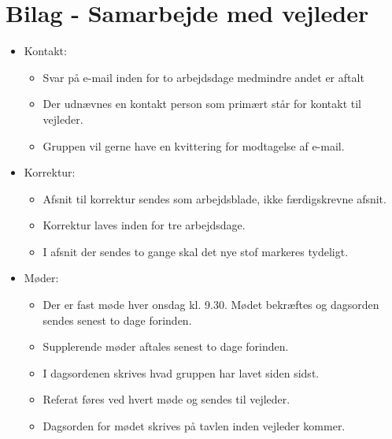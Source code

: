   \chapter{Bilag - Samarbejde med vejleder}
  \label{Bilag4}
  
   \begin{itemize}
	
	\item Kontakt:
	
	\begin{itemize}
		\item Svar på e-mail inden for to arbejdsdage medmindre andet er aftalt
		\item Der udnævnes en kontakt person som primært står for kontakt til vejleder.
		\item Gruppen vil gerne have en kvittering for modtagelse af e-mail.
	\end{itemize}
	
	\item Korrektur: 
	
	\begin{itemize}
		\item Afsnit til korrektur sendes som arbejdsblade, ikke færdigskrevne afsnit. 
		\item Korrektur laves inden for tre arbejdsdage.
		\item I afsnit der sendes to gange skal det nye stof markeres tydeligt.
	\end{itemize}
	
	\item Møder:
	
	\begin{itemize}
		\item Der er fast møde hver onsdag kl. 9.30. Mødet bekræftes og dagsorden sendes senest to dage forinden. 
		\item Supplerende møder aftales senest to dage forinden. 
		\item I dagsordenen skrives hvad gruppen har lavet siden sidst. 
		\item Referat føres ved hvert møde og sendes til vejleder. 
		\item Dagsorden for mødet skrives på tavlen inden vejleder kommer.
	\end{itemize}
	
\end{itemize}

\clearpage